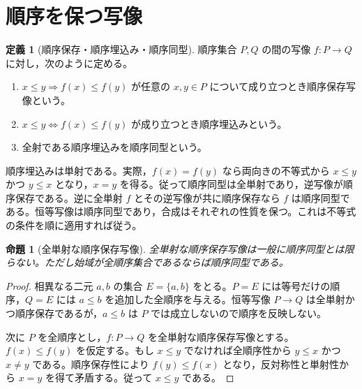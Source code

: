 \documentclass[a5paper,10pt,dvipdfmx]{jsarticle}
\theoremstyle{definition}
\newtheorem{defn}[ruledef]{定義}
\theoremstyle{plain}
\newtheorem{prop}[ruledef]{命題}
\newcommand{\iffc}{\Longleftrightarrow}
\newcommand{\impc}{\Longrightarrow}
\begin{document}
\section{順序を保つ写像}
\begin{defn}[順序保存・順序埋込み・順序同型]\label{k76}
順序集合 $P,Q$ の間の写像 $f:P\to Q$ に対し，次のように定める。
\begin{enumerate}
\item $x\leq y\impc f(x)\leq f(y)$ が任意の $x,y\in P$ について成り立つとき順序保存写像という。
\item $x\leq y\iffc f(x)\leq f(y)$ が成り立つとき順序埋込みという。
\item 全射である順序埋込みを順序同型という。
\end{enumerate}
\end{defn}
順序埋込みは単射である。実際，$f(x)=f(y)$ なら両向きの不等式から $x\leq y$ かつ $y\leq x$ となり，$x=y$ を得る。従って順序同型は全単射であり，逆写像が順序保存である。逆に全単射 $f$ とその逆写像が共に順序保存なら $f$ は順序同型である。恒等写像は順序同型であり，合成はそれぞれの性質を保つ。これは不等式の条件を順に適用すれば従う。
\begin{prop}[全単射な順序保存写像]\label{k77}
全単射な順序保存写像は一般に順序同型とは限らない。ただし始域が全順序集合であるならば順序同型である。
\end{prop}
\begin{proof}
相異なる二元 $a,b$ の集合 $E=\{a,b\}$ をとる。$P=E$ には等号だけの順序，$Q=E$ には $a\leq b$ を追加した全順序を与える。恒等写像 $P\to Q$ は全単射かつ順序保存であるが，$a\leq b$ は $P$ では成立しないので順序を反映しない。

次に $P$ を全順序とし，$f:P\to Q$ を全単射な順序保存写像とする。$f(x)\leq f(y)$ を仮定する。もし $x\leq y$ でなければ全順序性から $y\leq x$ かつ $x\ne y$ である。順序保存性により $f(y)\leq f(x)$ となり，反対称性と単射性から $x=y$ を得て矛盾する。従って $x\leq y$ である。
\end{proof}
\end{document}
